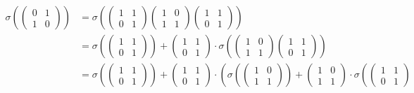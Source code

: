 	\begin{align*}
	\sigma\left(
			\left(\begin{matrix} 0 & 1 \\ 1 & 0 \end{matrix}\right)
			\right) &=
	\sigma\left(
			\left(\begin{matrix} 1 & 1 \\ 0 & 1 \end{matrix}\right)
			\left(\begin{matrix} 1 & 0 \\ 1 & 1 \end{matrix}\right)
			\left(\begin{matrix} 1 & 1 \\ 0 & 1 \end{matrix}\right)
			\right) \\
		&=
	\sigma\left(
			\left(\begin{matrix} 1 & 1 \\ 0 & 1 \end{matrix}\right)
			\right) +
	\left(\begin{matrix} 1 & 1 \\ 0 & 1 \end{matrix}\right) \cdot
	\sigma\left(
			\left(\begin{matrix} 1 & 0 \\ 1 & 1 \end{matrix}\right)
			\left(\begin{matrix} 1 & 1 \\ 0 & 1 \end{matrix}\right)
			\right) \\ 
	&=
	\sigma\left(
			\left(\begin{matrix} 1 & 1 \\ 0 & 1 \end{matrix}\right)
			\right) +
	\left(\begin{matrix} 1 & 1 \\ 0 & 1 \end{matrix}\right) \cdot
	\left(
			\sigma\left(
				\left(\begin{matrix} 1 & 0 \\ 1 & 1 \end{matrix}\right)
				\right) +
			\left(\begin{matrix} 1 & 0 \\ 1 & 1 \end{matrix}\right)\cdot
			\sigma\left(
				\left(\begin{matrix} 1 & 1 \\ 0 & 1 \end{matrix}\right)

\end{align*}
